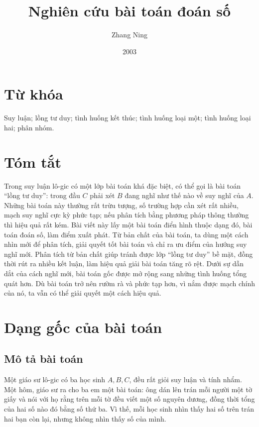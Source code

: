 \documentclass[11pt]{article}
\title{Nghiên cứu bài toán đoán số}
\author{Zhang Ning}
\date{2003}
\begin{document}
\maketitle


\section*{Từ khóa}

Suy luận; lồng tư duy; tình huống kết thúc; tình huống loại một; tình
huống loại hai; phân nhóm.

\section*{Tóm tắt}

Trong suy luận lô-gic có một lớp bài toán khá đặc biệt, có thể gọi là bài
toán ``lồng tư duy'': trong đầu \(C\) phải xét \(B\) đang nghĩ như thế nào
về suy nghĩ của \(A\). Những bài toán này thường rất trừu tượng, số trường
hợp cần xét rất nhiều, mạch suy nghĩ cực kỳ phức tạp; nếu phân tích bằng
phương pháp thông thường thì hiệu quả rất kém. Bài viết này lấy một bài toán
điển hình thuộc dạng đó, bài toán đoán số, làm điểm xuất phát. Từ bản chất
của bài toán, ta dùng một cách nhìn mới để phân tích, giải quyết tốt bài toán
và chỉ ra ưu điểm của hướng suy nghĩ mới. Phân tích từ bản chất giúp tránh
được lớp ``lồng tư duy'' bề mặt, đồng thời rút ra nhiều kết luận, làm hiệu
quả giải bài toán tăng rõ rệt. Dưới sự dẫn dắt của cách nghĩ mới, bài toán
gốc được mở rộng sang những tình huống tổng quát hơn. Dù bài toán trở nên
rườm rà và phức tạp hơn, vì nắm được mạch chính của nó, ta vẫn có thể giải
quyết một cách hiệu quả.

\section{Dạng gốc của bài toán}

\subsection*{Mô tả bài toán}

Một giáo sư lô-gic có ba học sinh \(A,B,C\), đều rất giỏi suy luận và tính
nhẩm. Một hôm, giáo sư ra cho ba em một bài toán: ông dán lên trán mỗi người
một tờ giấy và nói với họ rằng trên mỗi tờ đều viết một số nguyên dương, đồng
thời tổng của hai số nào đó bằng số thứ ba. Vì thế, mỗi học sinh nhìn thấy
hai số trên trán hai bạn còn lại, nhưng không nhìn thấy số của mình.
\end{document}
